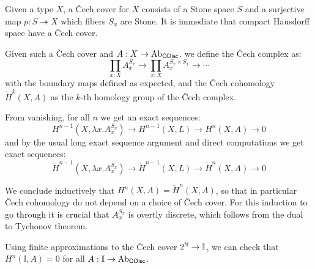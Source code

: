 \documentclass{../util/zariski}
\begin{document}
Given a type $X$, a \v{C}ech cover for $X$ consists of a Stone space $S$ and a surjective map $p:S\twoheadrightarrow X$ which fibers $S_x$ are Stone. It is immediate that compact Hausdorff space have a \v{C}ech cover.

Given such a \v{C}ech cover and $A:X\to \mathrm{Ab}_{\mathsf{ODisc}}$. we define the \v{C}ech complex as:
\[\prod_{x:X}A_x^{S_x} \to \prod_{x:X}A_x^{S_x\times S_x} \to \cdots\]
with the boundary maps defined as expected, and the \v{C}ech cohomology $\check{H}^k(X,A)$ as the $k$-th homology group of the \v{C}ech complex.

From vanishing, for all $n$ we get an exact sequences:
\[H^{n-1}(X,\lambda x.A_x^{S_x}) \to H^{n-1}(X,L)\to H^n(X,A)\to 0\]
and by the usual long exact sequence argument and direct computations we get exact sequences:
\[\check{H}^{n-1}(X,\lambda x.A_x^{S_x}) \to \check{H}^{n-1}(X,L)\to \check{H}^n(X,A)\to 0\]

We conclude inductively that $H^n(X,A) = \check{H}^n(X,A)$, so that in particular \v{C}ech cohomology do not depend on a choice of \v{C}ech cover. For this induction to go through it is crucial that $A_x^{S_x}$ is overtly discrete, which follows from the dual to Tychonov theorem.

Using finite approximations to the \v{C}ech cover $2^{\mathbb{N}}\to \mathbb{I}$, we can check that $H^n(\mathbb{I},A) = 0$ for all $A:\mathbb{I}\to \mathrm{Ab}_{\mathsf{ODisc}}$.

\printbibliography
\end{document}
